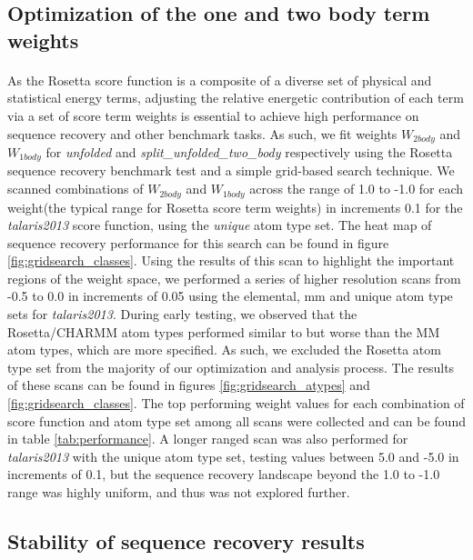 \subsection{Optimization of the one and two body term weights}
\paragraph{}
As the Rosetta score function is a composite of a diverse set of physical and statistical energy terms, adjusting the relative energetic contribution of each term via a set of score term weights is essential to achieve high performance on sequence recovery and other benchmark tasks\cite{rohl_protein_2004,leaver-fay_chapter_2013}.
As such, we fit weights $W_{2body}$ and $W_{1body}$ for \textit{unfolded} and \textit{split\_unfolded\_two\_body} respectively using the Rosetta sequence recovery benchmark test\cite{leaver-fay_chapter_2013} and a simple grid-based search technique.
We scanned combinations of $W_{2body}$ and $W_{1body}$ across the range of 1.0 to -1.0 for each weight(the typical range for Rosetta score term weights) in increments 0.1 for the \textit{talaris2013} score function, using the \textit{unique} atom type set.
The heat map of sequence recovery performance for this search can be found in figure \ref{fig:gridsearch_classes}.
Using the results of this scan to highlight the important regions of the weight space, we performed a series of higher resolution scans from -0.5 to 0.0 in increments of 0.05 using the elemental, mm and unique atom type sets for \textit{talaris2013}.
During early testing, we observed that the Rosetta/CHARMM atom types performed similar to but worse than the MM atom types, which are more specified.
As such, we excluded the Rosetta atom type set from the majority of our optimization and analysis process.
The results of these scans can be found in figures \ref{fig:gridsearch_atypes} and \ref{fig:gridsearch_classes}.
The top performing weight values for each combination of score function and atom type set among all scans were collected and can be found in table \ref{tab:performance}.
A longer ranged scan was also performed for \textit{talaris2013} with the unique atom type set, testing values between 5.0 and -5.0 in increments of 0.1, but the sequence recovery landscape beyond the 1.0 to -1.0 range was highly uniform, and thus was not explored further.

\subsection{Stability of sequence recovery results}
